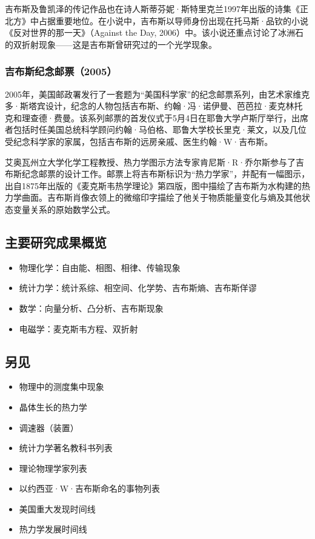 吉布斯及鲁凯泽的传记作品也在诗人斯蒂芬妮·斯特里克兰1997年出版的诗集《正北方》中占据重要地位。在小说中，吉布斯以导师身份出现在托马斯·品钦的小说《反对世界的那一天》（Against the Day, 2006）中。该小说还重点讨论了冰洲石的双折射现象——这是吉布斯曾研究过的一个光学现象。
\subsubsection{吉布斯纪念邮票（2005）}
2005年，美国邮政署发行了一套题为“美国科学家”的纪念邮票系列，由艺术家维克多·斯塔宾设计，纪念的人物包括吉布斯、约翰·冯·诺伊曼、芭芭拉·麦克林托克和理查德·费曼。该系列邮票的首发仪式于5月4日在耶鲁大学卢斯厅举行，出席者包括时任美国总统科学顾问约翰·马伯格、耶鲁大学校长里克·莱文，以及几位受纪念科学家的家属，包括吉布斯的远房亲戚、医生约翰·W·吉布斯。

艾奥瓦州立大学化学工程教授、热力学图示方法专家肯尼斯·R·乔尔斯参与了吉布斯纪念邮票的设计工作。邮票上将吉布斯标识为“热力学家”，并配有一幅图示，出自1875年出版的《麦克斯韦热学理论》第四版，图中描绘了吉布斯为水构建的热力学曲面。吉布斯肖像衣领上的微缩印字描绘了他关于物质能量变化与熵及其他状态变量关系的原始数学公式。
\subsection{主要研究成果概览}
\begin{itemize}
\item 物理化学：自由能、相图、相律、传输现象
\item 统计力学：统计系综、相空间、化学势、吉布斯熵、吉布斯佯谬
\item 数学：向量分析、凸分析、吉布斯现象
\item 电磁学：麦克斯韦方程、双折射
\end{itemize}
\subsection{另见}
\begin{itemize}
\item 物理中的测度集中现象
\item 晶体生长的热力学
\item 调速器（装置）
\item 统计力学著名教科书列表
\item 理论物理学家列表
\item 以约西亚·W·吉布斯命名的事物列表
\item 美国重大发现时间线
\item 热力学发展时间线
\end{itemize}
